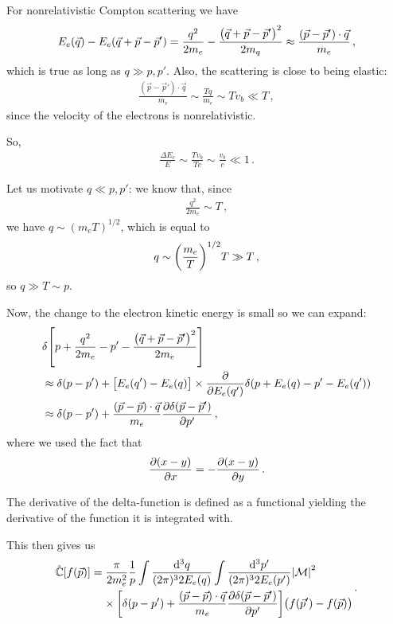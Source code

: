 \documentclass[main.tex]{subfiles}
\begin{document}
For nonrelativistic Compton scattering we have 
%
\begin{align}
E_e(\vec{q}) - E_e (\vec{q} + \vec{p} - \vec{p}')
 = \frac{q^2}{2 m_e} - \frac{\qty(\vec{q} + \vec{p} - \vec{p}')^2}{2m_q}
 \approx \frac{(\vec{p} - \vec{p}') \cdot \vec{q}}{m_e}
\,,
\end{align}
%
which is true as long as \(q \gg p, p'\). 
Also, the scattering is close to being elastic: 
%
\begin{align}
  \frac{(\vec{p} - \vec{p}') \cdot \vec{q}}{m_e}
  \sim \frac{Tq}{m_e} \sim T v_b \ll T
\,,
\end{align}
%
since the velocity of the electrons is nonrelativistic. 

So, 
%
\begin{align}
\frac{\Delta E_e}{E} \sim \frac{T v_b}{T c} \sim \frac{v_b}{c} \ll 1
\,.
\end{align}

Let us motivate \(q \ll p, p'\): we know that, since 
%
\begin{align}
\frac{q^2}{2m_e} \sim T
\,,
\end{align}
%
we have \(q \sim (m_e T)^{1/2} \), which is equal to 
%
\begin{align}
q \sim \qty(\frac{m_e}{T})^{1/2} T \gg T 
\,,
\end{align}
%
so \(q \gg T \sim p\). 

Now, the change to the electron kinetic energy is small so we can expand: 
%
\begin{align}
&\delta \qty[p + \frac{q^2}{2m_e} - p' - \frac{\qty(\vec{q} + \vec{p} -\vec{p}')^2}{2m_e} ]   \\
&\approx
\delta (p - p')
 + \qty[E_e (q') - E_e (q)]
 \times \pdv{}{E_e(q')} \delta (p + E_e (q) - p' - E_e(q'))  \\
 &\approx 
\delta (p - p')
+ \frac{(\vec{p}- \vec{p}) \cdot \vec{q}}{m_e} 
\pdv{ \delta (\vec{p} - \vec{p}')}{p'} 
\,,
\end{align}
%
where we used the fact that 
%
\begin{align}
\pdv{(x-y)}{x} = - \pdv{(x-y)}{y}
\,.
\end{align}

The derivative of the delta-function is defined as a functional yielding the derivative of the function it is integrated with. 

This then gives us 
%
\begin{align}
\begin{split}
\hat{\mathbb{C}} [f(\vec{p})] &= \frac{\pi}{2 m_e^2}
\frac{1}{p} 
\int \frac{ \dd[3]{q}}{(2\pi)^3 2 E_e (q)}
\int \frac{ \dd[3]{p'}}{(2\pi)^3 2 E_e (p')} 
\abs{\mathcal{M}}^2 \\
&\phantom{=}\ 
\times\qty[\delta (p - p') + \frac{(\vec{p}- \vec{p}) \cdot \vec{q}}{m_e} 
\pdv{ \delta (\vec{p} - \vec{p}')}{p'} 
] \qty(f (\vec{p}') - f(\vec{p})) 
\end{split}
\,.
\end{align}
\end{document}
